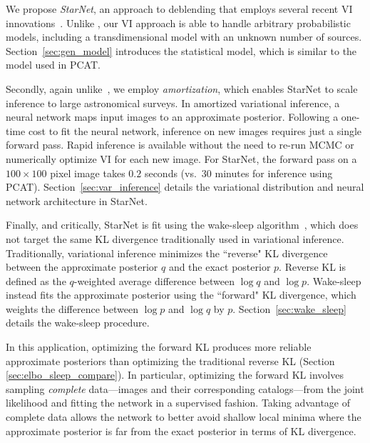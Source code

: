 \nopagebreak[4]

We propose {\itshape StarNet}, an approach to deblending that employs several recent VI innovations~\citep{zhang2019advances,le2020revisiting}.
Unlike \cite{regier2019_celeste}, our VI approach is able to handle arbitrary probabilistic models, including a transdimensional model with an unknown number of sources. Section~\ref{sec:gen_model} introduces the statistical model, which is similar to the model used in PCAT.

Secondly, again unlike~\cite{regier2019_celeste}, 
we employ {\itshape amortization}, which enables StarNet to scale inference to large astronomical surveys. 
In amortized variational inference, a neural network maps input images to an approximate posterior.
Following a one-time cost to fit the neural network, inference 
on new images requires just a single forward pass.
Rapid inference is available without the need to re-run MCMC or numerically optimize VI for each new image. 
For StarNet, the forward pass on 
a $100 \times 100$ pixel image takes $0.2$ seconds (vs.~30 minutes for inference using PCAT).
Section~\ref{sec:var_inference} details the variational distribution and neural network architecture in StarNet. 

Finally, and critically, StarNet is fit using the wake-sleep algorithm~\citep{Hinton1995wake_sleep}, which does not target the same KL divergence traditionally used in  variational inference. Traditionally, variational inference minimizes the ``reverse" KL divergence between the approximate posterior $q$ and the exact posterior $p$.
Reverse KL is defined as the $q$-weighted average difference between $\log q$ and $\log p$. 
Wake-sleep instead fits the approximate posterior using the ``forward" KL divergence, which weights the difference between $\log p$ and $\log q$ by $p$.
Section~\ref{sec:wake_sleep} details the wake-sleep procedure. 


In this application, optimizing the forward KL produces more reliable approximate posteriors than optimizing the traditional reverse KL (Section \ref{sec:elbo_sleep_compare}). 
In particular, optimizing the forward KL involves sampling {\itshape complete} data---images and their corresponding catalogs---from the joint likelihood and fitting the network in a supervised fashion.
Taking advantage of complete data allows the network to better avoid shallow local minima where the approximate posterior is far from the exact posterior in terms of KL divergence. 

